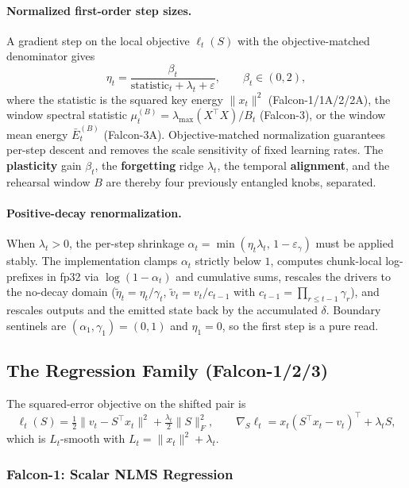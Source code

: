 \paragraph{Normalized first-order step sizes.} A gradient step on the local objective $\ell_t(S)$ with the objective-matched denominator gives
\[
\eta_t = \frac{\beta_t}{\text{statistic}_t + \lambda_t + \varepsilon}, \qquad \beta_t \in (0, 2),
\]
where the statistic is the squared key energy $\|x_t\|^2$ (Falcon-1/1A/2/2A), the window spectral statistic $\mu_t^{(B)} = \lambda_{\max}(X^\top X)/B_t$ (Falcon-3), or the window mean energy $\bar{E}_t^{(B)}$ (Falcon-3A). Objective-matched normalization guarantees per-step descent and removes the scale sensitivity of fixed learning rates. The \textbf{plasticity} gain $\beta_t$, the \textbf{forgetting} ridge $\lambda_t$, the temporal \textbf{alignment}, and the rehearsal window $B$ are thereby four previously entangled knobs, separated.

\paragraph{Positive-decay renormalization.} When $\lambda_t > 0$, the per-step shrinkage $\alpha_t = \min(\eta_t \lambda_t,\, 1 - \varepsilon_\gamma)$ must be applied stably. The implementation clamps $\alpha_t$ strictly below $1$, computes chunk-local log-prefixes in fp32 via $\log(1 - \alpha_t)$ and cumulative sums, rescales the drivers to the no-decay domain ($\tilde{\eta}_t = \eta_t / \gamma_t$, $\tilde{v}_t = v_t / c_{t-1}$ with $c_{t-1} = \prod_{r \le t-1} \gamma_r$), and rescales outputs and the emitted state back by the accumulated $\delta$. Boundary sentinels are $(\alpha_1, \gamma_1) = (0, 1)$ and $\eta_1 = 0$, so the first step is a pure read.

\subsection{The Regression Family (Falcon-1/2/3)}

The squared-error objective on the shifted pair is
\[
\ell_t(S) = \tfrac{1}{2}\|v_t - S^\top x_t\|^2 + \tfrac{\lambda_t}{2}\|S\|_F^2,
\qquad
\nabla_S \ell_t = x_t (S^\top x_t - v_t)^\top + \lambda_t S,
\]
which is $L_t$-smooth with $L_t = \|x_t\|^2 + \lambda_t$.

\subsubsection{Falcon-1: Scalar NLMS Regression}


